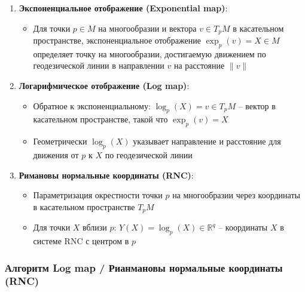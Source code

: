 \documentclass[a4paper,12pt]{article}
\begin{document}
\begin{enumerate}
    \item \textbf{Экспоненциальное отображение (Exponential map)}:
    \begin{itemize}
        \item Для точки $p \in M$ на многообразии и вектора $v \in T_pM$ в касательном пространстве, экспоненциальное отображение $\exp_p(v) = X \in M$ определяет точку на многообразии, достигаемую движением по геодезической линии в направлении $v$ на расстояние $\|v\|$
    \end{itemize}

    \item \textbf{Логарифмическое отображение (Log map)}:
    \begin{itemize}
        \item Обратное к экспоненциальному: $\log_p(X) = v \in T_pM$ -- вектор в касательном пространстве, такой что $\exp_p(v) = X$
        \item Геометрически $\log_p(X)$ указывает направление и расстояние для движения от $p$ к $X$ по геодезической линии
    \end{itemize}

    \item \textbf{Римановы нормальные координаты (RNC)}:
    \begin{itemize}
        \item Параметризация окрестности точки $p$ на многообразии через координаты в касательном пространстве $T_pM$
        \item Для точки $X$ вблизи $p$: $Y(X) = \log_p(X) \in \mathbb{R}^q$ -- координаты $X$ в системе RNC с центром в $p$
    \end{itemize}
\end{enumerate}

\subsubsection{Алгоритм Log map / Рианмановы нормальные координаты (RNC)}
\end{document}

